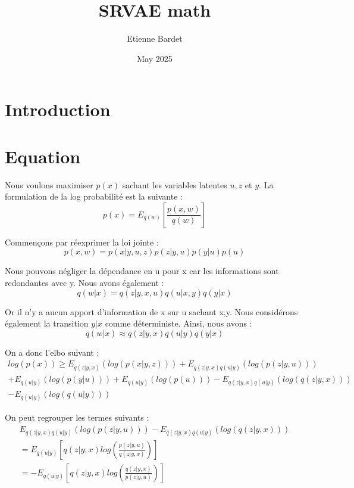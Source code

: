 \documentclass{article}
\title{SRVAE math}
\author{Etienne Bardet}
\date{May 2025}
\begin{document}
\maketitle

\section{Introduction}

\section{Equation}

Nous voulons maximiser $p(x)$ sachant les variables latentes $u,z$ et $y$.
La formulation de la log probabilité est la suivante :
\begin{equation}
    p(x) = E_{q(w)}[\frac{p(x,w)}{q(w)}]
\end{equation}

Commençons par réexprimer la loi jointe :
\begin{equation}
    p(x,w) = p(x|y,u,z)p(z|y,u)p(y|u)p(u)
\end{equation}

Nous pouvons négliger la dépendance en u pour x car les informations sont redondantes avec y.
Nous avons également : 
\begin{equation}
     q(w|x) = q(z|y,x,u)q(u|x,y)q(y|x)
\end{equation}

Or il n'y a aucun apport d'information de x sur u sachant x,y. Nous considérons également la transition $y|x$ comme déterministe.
Ainsi, nous avons : 
\begin{equation}
    q(w|x) \approx q(z|y,x)q(u|y)q(y|x)
\end{equation}

On a  donc l'elbo suivant :
\begin{multline}
    log(p(x)) \geq E_{q(z|y,x)}(log(p(x|y,z))) + E_{q(z|y,x)q(u|y)}(log(p(z|y,u))) \\+ E_{q(u|y)}(log(p(y|u))) + E_{q(u|y)}(log(p(u))) - E_{q(z|y,x)q(u|y)}(log(q(z|y,x)))\\ - E_{q(u|y)}(log(q(u|y)))
\end{multline}

On peut regrouper les termes suivants :
\begin{multline}    
    E_{q(z|y,x)q(u|y)}(log(p(z|y,u))) - E_{q(z|y,x)q(u|y)}(log(q(z|y,x)))\\ = E_{q(u|y)}[q(z|y,x)log(\frac{p(z|y,u)}{q(z|y,x)})]\\ = - E_{q(u|y)}[q(z|y,x)log(\frac{q(z|y,x)}{p(z|y,u)}) ] 
\end{multline}
\end{document}
